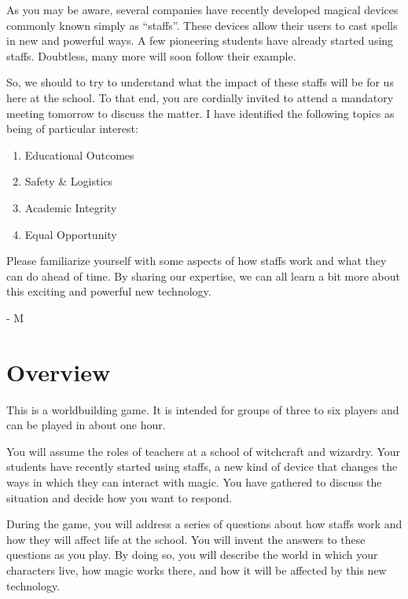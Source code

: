 \documentclass[a6paper, 11pt, parskip=half]{scrartcl}
\begin{document}
As you may be aware, several companies have recently developed magical devices commonly known simply as ``staffs''.
These devices allow their users to cast spells in new and powerful ways. 
A few pioneering students have already started using staffs.
Doubtless, many more will soon follow their example.

So, we should to try to understand what the impact of these staffs will be for us here at the school.
To that end, you are cordially invited to attend a mandatory meeting tomorrow to discuss the matter.
I have identified the following topics as being of particular interest:
\begin{enumerate}[nosep]
	\item Educational Outcomes
	\item Safety \& Logistics
	\item Academic Integrity
	\item Equal Opportunity
\end{enumerate}   

Please familiarize yourself with some aspects of how staffs work and what they can do ahead of time.
By sharing our expertise, we can all learn a bit more about this exciting and powerful new technology.

\hspace{4.5cm}\huge- M
\setmainfont{Cochin}
\normalsize

\newpage
\enlargethispage{3.5\baselineskip}

\section*{Overview}
This is a worldbuilding game. It is intended for groups of three to six players and can be played in about one hour.

You will assume the roles of teachers at a school of witchcraft and wizardry. Your students have recently started using staffs, a new kind of device that changes the ways in which they can interact with magic. You have gathered to discuss the situation and decide how you want to respond.

During the game, you will address a series of questions about how staffs work and how they will affect life at the school. You will invent the answers to these questions as you play. By doing so, you will describe the world in which your characters live, how magic works there, and how it will be affected by this new technology.

\newpage
\enlargethispage{3.5\baselineskip}
\end{document}
